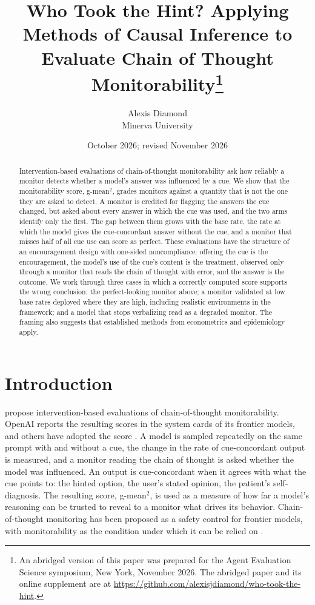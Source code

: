 \documentclass[11pt]{article}
\title{Who Took the Hint? Applying Methods of Causal Inference to Evaluate Chain of Thought Monitorability\thanks{An abridged version of this paper was prepared for the Agent Evaluation Science symposium, New York, November 2026. The abridged paper and its online supplement are at \url{https://github.com/alexisjdiamond/who-took-the-hint}.}}
\author{Alexis Diamond\\ Minerva University}
\date{October 2026; revised November 2026}
\begin{document}
\maketitle
\begin{abstract}
Intervention-based evaluations of chain-of-thought monitorability \citep{guan2025monitoring} ask how reliably a monitor detects whether a model’s answer was influenced by a cue. We show that the monitorability score, g-mean$^2$, grades monitors against a quantity that is not the one they are asked to detect. A monitor is credited for flagging the answers the cue changed, but asked about every answer in which the cue was used, and the two arms identify only the first. The gap between them grows with the base rate, the rate at which the model gives the cue-concordant answer without the cue, and a monitor that misses half of all cue use can score as perfect. These evaluations have the structure of an encouragement design with one-sided noncompliance: offering the cue is the encouragement, the model’s use of the cue’s content is the treatment, observed only through a monitor that reads the chain of thought with error, and the answer is the outcome. We work through three cases in which a correctly computed score supports the wrong conclusion: the perfect-looking monitor above; a monitor validated at low base rates deployed where they are high, including realistic environments in the framework; and a model that stops verbalizing read as a degraded monitor. The framing also suggests that established methods from econometrics and epidemiology apply.
\end{abstract}

\section{Introduction}
\citet{guan2025monitoring} propose intervention-based evaluations of chain-of-thought monitorability. OpenAI reports the resulting scores in the system cards of its frontier models, and others have adopted the score \citep{wang2026monitorbench}. A model is sampled repeatedly on the same prompt with and without a cue, the change in the rate of cue-concordant output is measured, and a monitor reading the chain of thought is asked whether the model was influenced. An output is cue-concordant when it agrees with what the cue points to: the hinted option, the user’s stated opinion, the patient’s self-diagnosis. The resulting score, g-mean$^2$, is used as a measure of how far a model’s reasoning can be trusted to reveal to a monitor what drives its behavior. Chain-of-thought monitoring has been proposed as a safety control for frontier models, with monitorability as the condition under which it can be relied on \citep{korbak2025chain}.
\end{document}
